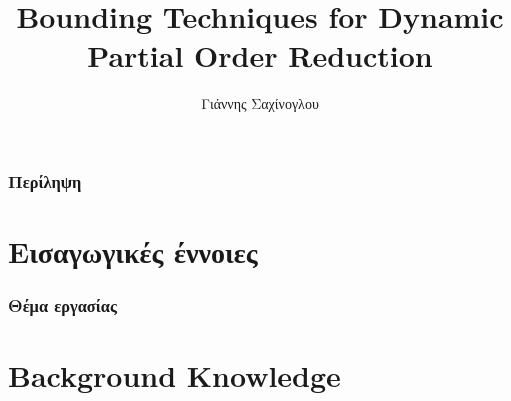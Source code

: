 \documentclass[9pt]{beamer}
\title[Short title]{Bounding Techniques for Dynamic Partial Order Reduction} %
\author{Γιάννης Σαχίνογλου} %
\institute[NTUA] %
{
ΣΗΜΜΥ - ΕΜΠ \\ %
\medskip
\textit{03112089} %
}
\date{} %
\begin{document}
\begin{frame}
\titlepage %
\end{frame}

\begin{frame}
\frametitle{Περίληψη} %
\tableofcontents %
\end{frame}


\section{Εισαγωγικές έννοιες} %


\begin{frame}
\frametitle{Θέμα εργασίας}

\end{frame}

\section{Background Knowledge}
\end{document}
